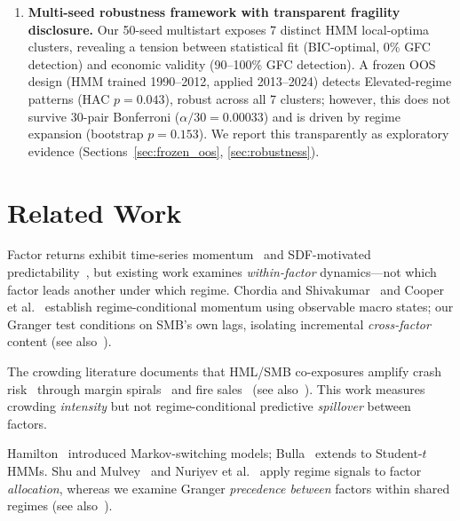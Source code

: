 \documentclass[sigconf,anonymous]{acmart}
\begin{document}
\begin{enumerate}
    \item \textbf{Multi-seed robustness framework with transparent fragility disclosure.}
    Our 50-seed multistart exposes 7 distinct HMM local-optima clusters,
    revealing a tension between statistical fit (BIC-optimal, 0\% GFC
    detection) and economic validity (90--100\% GFC detection).
    A frozen OOS design (HMM trained 1990--2012, applied 2013--2024)
    detects Elevated-regime patterns (HAC $p = 0.043$), robust across
    all 7 clusters; however, this does not survive 30-pair Bonferroni
    ($\alpha/30 = 0.00033$) and is driven by regime expansion
    (bootstrap $p = 0.153$). We report this transparently as
    exploratory evidence (Sections~\ref{sec:frozen_oos}, \ref{sec:robustness}).
\end{enumerate}

\section{Related Work}

Factor returns exhibit time-series momentum~\cite{ehsani2022factor,gupta2019factor}
and SDF-motivated predictability~\cite{haddad2020factor}, but existing work examines
\emph{within-factor} dynamics---not which factor leads another under which regime.
Chordia and Shivakumar~\cite{chordia2002momentum} and Cooper et al.~\cite{cooper2004market}
establish regime-conditional momentum using observable macro states; our Granger test
conditions on SMB's own lags, isolating incremental \emph{cross-factor} content
(see also~\cite{fama1993common,fama2015five,barroso2015momentum,daniel2016momentum,asness2013value}).

The crowding literature documents that HML/SMB co-exposures amplify crash
risk~\cite{marks2019factor,chincarini2026crowded,betermier2025investor} through
margin spirals~\cite{brunnermeier2009market} and fire
sales~\cite{shleifer1997limits,coval2007asset}
(see also~\cite{anton2014connected,lou2022comomentum,greenwood2011stock}).
This work measures crowding \emph{intensity} but not regime-conditional
predictive \emph{spillover} between factors.

Hamilton~\cite{hamilton1989new} introduced Markov-switching models;
Bulla~\cite{bulla2011hidden} extends to Student-$t$ HMMs.
Shu and Mulvey~\cite{shu2025dynamic} and Nuriyev et al.~\cite{nuriyev2024regime}
apply regime signals to factor \emph{allocation}, whereas we examine Granger
\emph{precedence between} factors within shared regimes
(see also~\cite{krolzig1997markov,chincoli2017linear,ang2002regime,guidolin2007asset,oelschlager2024fhmm}).
\end{document}
